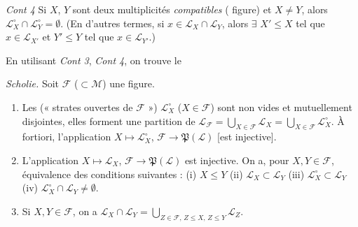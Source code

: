 \documentclass[11pt,a4paper]{article}
\begin{document}
\emph{Cont 4} \quad Si $X$, $Y$ sont deux multiplicités \emph{compatibles} (  figure) et $X \neq Y$, alors $\mathcal{L}^{\circ}_X \cap \mathcal{L}^{\circ}_Y = \emptyset$. (En d'autres termes, si $x \in \mathcal{L}_X \cap \mathcal{L}_Y$, alors $\exists$  $X' \leq X$ tel que $x \in \mathcal{L}_{X'}$ et $Y' \leq Y$ tel que $x \in \mathcal{L}_{Y'}$.) 



En utilisant \emph{Cont 3}, \emph{Cont 4}, on trouve le

\emph{Scholie.} Soit $\mathcal{F}$ ($\subset \mathcal{M}$) une figure. 
\begin{enumerate}
  \item[a)] Les \struck{\ill{}}  (« strates ouvertes de $\mathcal{F}$ ») $\mathcal{L}^{\circ}_X$ ($X \in \mathcal{F}$) sont non vides et mutuellement disjointes, elles forment une partition de $\mathcal{L}_{\mathcal{F}} = \bigcup_{X \in \mathcal{F}} \mathcal{L}_X = \bigcup_{X \in \mathcal{F}} \mathcal{L}^{\circ}_X$.  À fortiori, l'application $X \mapsto \mathcal{L}^{\circ}_X$, $\mathcal{F} \to \mathfrak{P}(\mathcal{L})$ [est injective].
  \item[b)] L'application $X \mapsto \mathcal{L}_X$, $\mathcal{F} \to \mathfrak{P}(\mathcal{L})$ est injective. On a, pour $X, Y \in \mathcal{F}$, équivalence des conditions suivantes : (i) $X \leq Y$ \quad (ii) $\mathcal{L}_X \subset \mathcal{L}_Y$ \quad (iii) $\mathcal{L}^{\circ}_X \subset \mathcal{L}_Y$ \quad (iv) $\mathcal{L}^{\circ}_X \cap \mathcal{L}_Y \neq \emptyset$.
  \item[c)] Si $X, Y \in \mathcal{F}$, on a $\mathcal{L}_X \cap \mathcal{L}_Y = \bigcup_{Z \in \mathcal{F},\, Z \leq X,\, Z \leq Y} \mathcal{L}_Z$.
\end{enumerate}
\end{document}
